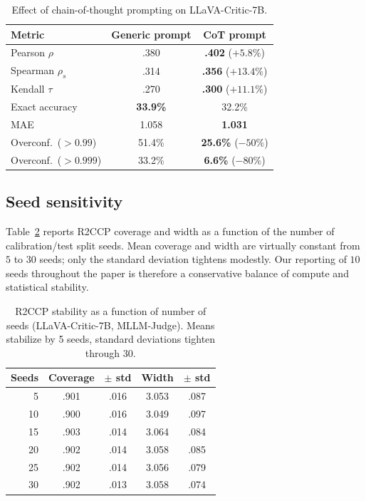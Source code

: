 \documentclass{article}
\begin{document}
\begin{table}[t]
\centering
\caption{Effect of chain-of-thought prompting on LLaVA-Critic-7B.}
\label{tab:cot_effect}
\small
\begin{tabular}{lcc}
\toprule
\textbf{Metric} & \textbf{Generic prompt} & \textbf{CoT prompt} \\
\midrule
Pearson $\rho$ & .380 & \textbf{.402} ($+5.8\%$) \\
Spearman $\rho_s$ & .314 & \textbf{.356} ($+13.4\%$) \\
Kendall $\tau$ & .270 & \textbf{.300} ($+11.1\%$) \\
Exact accuracy & \textbf{33.9\%} & 32.2\% \\
MAE & 1.058 & \textbf{1.031} \\
\midrule
Overconf.\ ($> 0.99$) & 51.4\% & \textbf{25.6\%} ($-50\%$) \\
Overconf.\ ($> 0.999$) & 33.2\% & \textbf{6.6\%} ($-80\%$) \\
\bottomrule
\end{tabular}
\end{table}

\subsection{Seed sensitivity}
\label{app:seeds}

Table~\ref{tab:ablation_seeds} reports R2CCP coverage and width as a function of the number of calibration/test split seeds. Mean coverage and width are virtually constant from $5$ to $30$ seeds; only the standard deviation tightens modestly. Our reporting of $10$ seeds throughout the paper is therefore a conservative balance of compute and statistical stability.

\begin{table}[t]
\centering
\caption{R2CCP stability as a function of number of seeds (LLaVA-Critic-7B, MLLM-Judge). Means stabilize by 5 seeds, standard deviations tighten through 30.}
\label{tab:ablation_seeds}
\small
\begin{tabular}{rcccc}
\toprule
\textbf{Seeds} & \textbf{Coverage} & \textbf{$\pm$ std} & \textbf{Width} & \textbf{$\pm$ std} \\
\midrule
5 & .901 & .016 & 3.053 & .087 \\
10 & .900 & .016 & 3.049 & .097 \\
15 & .903 & .014 & 3.064 & .084 \\
20 & .902 & .014 & 3.058 & .085 \\
25 & .902 & .014 & 3.056 & .079 \\
30 & .902 & .013 & 3.058 & .074 \\
\bottomrule
\end{tabular}
\end{table}
\end{document}
